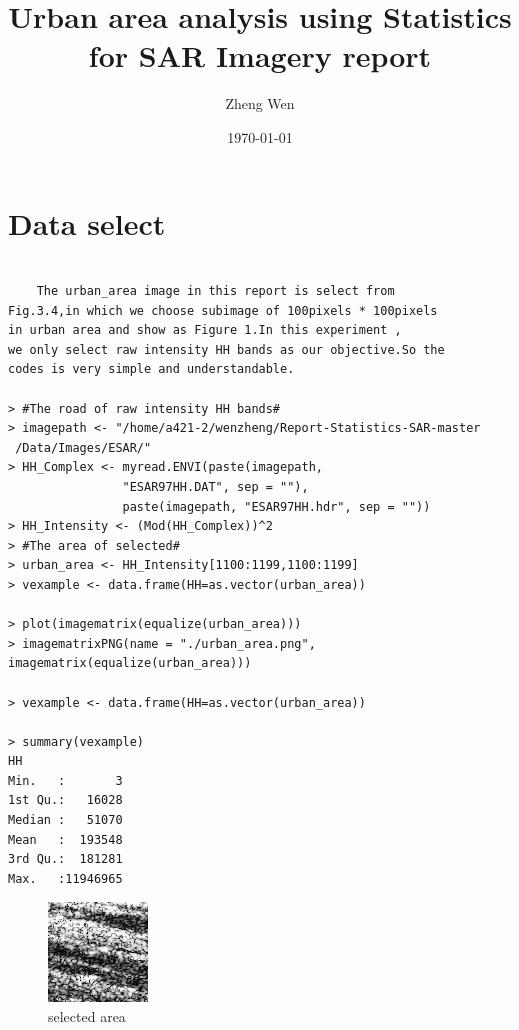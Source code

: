 \documentclass{article}
\title{Urban area analysis using Statistics for SAR Imagery report}
\author{Zheng Wen}
\date\today
\begin{document}
	
\maketitle
	\section{Data select}
	\begin{lstlisting}[frame=tb]
	
	The urban_area image in this report is select from 
Fig.3.4,in which we choose subimage of 100pixels * 100pixels
in urban area and show as Figure 1.In this experiment ,
we only select raw intensity HH bands as our objective.So the 
codes is very simple and understandable.

> #The road of raw intensity HH bands#
> imagepath <- "/home/a421-2/wenzheng/Report-Statistics-SAR-master
 /Data/Images/ESAR/"
> HH_Complex <- myread.ENVI(paste(imagepath,
				"ESAR97HH.DAT", sep = ""), 
				paste(imagepath, "ESAR97HH.hdr", sep = ""))
> HH_Intensity <- (Mod(HH_Complex))^2
> #The area of selected#
> urban_area <- HH_Intensity[1100:1199,1100:1199]
> vexample <- data.frame(HH=as.vector(urban_area))
	
> plot(imagematrix(equalize(urban_area)))
> imagematrixPNG(name = "./urban_area.png", imagematrix(equalize(urban_area)))
	
> vexample <- data.frame(HH=as.vector(urban_area))

> summary(vexample)
HH          
Min.   :       3  
1st Qu.:   16028  
Median :   51070  
Mean   :  193548  
3rd Qu.:  181281  
Max.   :11946965

	\end{lstlisting}

	\begin{figure}[htbp]
		\centering
		\includegraphics[width=0.5\linewidth]{urban_area.png}
		\caption{selected area}
		\label{fig:urban_area}
	\end{figure}
\end{document}
